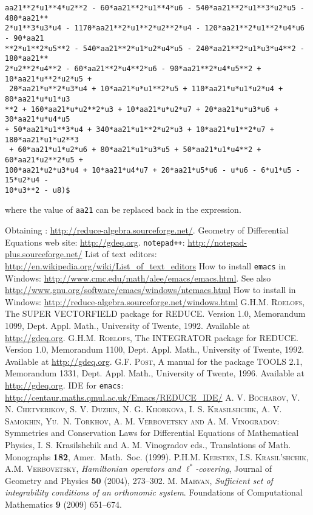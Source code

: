 \begin{verbatim}
aa21**2*u1**4*u2**2 - 60*aa21**2*u1**4*u6 - 540*aa21**2*u1**3*u2*u5 - 480*aa21**
2*u1**3*u3*u4 - 1170*aa21**2*u1**2*u2**2*u4 - 120*aa21**2*u1**2*u4*u6 - 90*aa21
**2*u1**2*u5**2 - 540*aa21**2*u1*u2*u4*u5 - 240*aa21**2*u1*u3*u4**2 - 180*aa21**
2*u2**2*u4**2 - 60*aa21**2*u4**2*u6 - 90*aa21**2*u4*u5**2 + 10*aa21*u**2*u2*u5 +
 20*aa21*u**2*u3*u4 + 10*aa21*u*u1**2*u5 + 110*aa21*u*u1*u2*u4 + 80*aa21*u*u1*u3
**2 + 160*aa21*u*u2**2*u3 + 10*aa21*u*u2*u7 + 20*aa21*u*u3*u6 + 30*aa21*u*u4*u5 
+ 50*aa21*u1**3*u4 + 340*aa21*u1**2*u2*u3 + 10*aa21*u1**2*u7 + 180*aa21*u1*u2**3
 + 60*aa21*u1*u2*u6 + 80*aa21*u1*u3*u5 + 50*aa21*u1*u4**2 + 60*aa21*u2**2*u5 + 
100*aa21*u2*u3*u4 + 10*aa21*u4*u7 + 20*aa21*u5*u6 - u*u6 - 6*u1*u5 - 15*u2*u4 - 
10*u3**2 - u8)$
\end{verbatim}
where the value of \texttt{aa21} can be replaced back in the expression.


\begin{thebibliography}{99}

 Obtaining \REDUCE: \url{http://reduce-algebra.sourceforge.net/}.
   Geometry of Differential Equations web site:
    \url{http://gdeq.org}.
   \texttt{notepad++}:
    \url{http://notepad-plus.sourceforge.net/}
   List of text editors:
    \url{http://en.wikipedia.org/wiki/List_of_text_editors}
   How to install \texttt{emacs} in Windows:
    \url{http://www.cmc.edu/math/alee/emacs/emacs.html}. See also
    \url{http://www.gnu.org/software/emacs/windows/ntemacs.html}
   How to install \REDUCE in Windows:
    \url{http://reduce-algebra.sourceforge.net/windows.html}
   \textsc{G.H.M. Roelofs}, The SUPER VECTORFIELD package for
    REDUCE. Version 1.0, Memorandum 1099, Dept. Appl. Math., University of
    Twente, 1992. Available at \url{http://gdeq.org}.
   \textsc{G.H.M. Roelofs}, The INTEGRATOR package for
    REDUCE. Version 1.0, Memorandum 1100, Dept. Appl. Math., University of
    Twente, 1992. Available at \url{http://gdeq.org}.
   \textsc{G.F. Post}, A manual for the package TOOLS 2.1,
    Memorandum 1331, Dept. Appl. Math., University of Twente, 1996. Available
    at \url{http://gdeq.org}.
   \REDUCE IDE for \texttt{emacs}:
    \url{http://centaur.maths.qmul.ac.uk/Emacs/REDUCE_IDE/}
   \textsc{A. V. Bocharov, V. N. Chetverikov, S. V.  Duzhin, N.
      G.  Khor{\cprime}kova, I. S.  Krasil{\cprime}shchik, A.  V.  Samokhin,
      Yu.\ N.  Torkhov, A. M. Verbovetsky and A. M.  Vinogradov}: Symmetries
    and Conservation Laws for Differential Equations of Mathematical Physics,
    I.  S.  Krasil{\cprime}shchik and A. M.  Vinogradov eds., Translations of
    Math.  Monographs \textbf{182}, Amer.\ Math.\ Soc. (1999).
   \textsc{P.H.M. Kersten, I.S. Krasil'shchik, A.M. Verbovetsky,}
    \emph{Hamiltonian operators and $\ell^*$-covering}, Journal of Geometry and
    Physics \textbf{50} (2004), 273--302.
   \textsc{M. Marvan}, \emph{Sufficient set of integrability
    conditions of an orthonomic system}.  Foundations of Computational
    Mathematics \textbf{9} (2009) 651--674.
\end{thebibliography}

